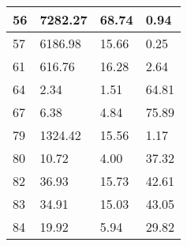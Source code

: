 \begin{tabular}{llll}
56 & 7282.27 & 68.74 & 0.94\\\midrule
57 & 6186.98 & 15.66 & 0.25\\\midrule
61 & 616.76 & 16.28 & 2.64\\\midrule
64 & 2.34 & 1.51 & 64.81\\\midrule
67 & 6.38 & 4.84 & 75.89\\\midrule
79 & 1324.42 & 15.56 & 1.17\\\midrule
80 & 10.72 & 4.00 & 37.32\\\midrule
82 & 36.93 & 15.73 & 42.61\\\midrule
83 & 34.91 & 15.03 & 43.05\\\midrule
84 & 19.92 & 5.94 & 29.82\\\midrule
\bottomrule
\end{tabular}
